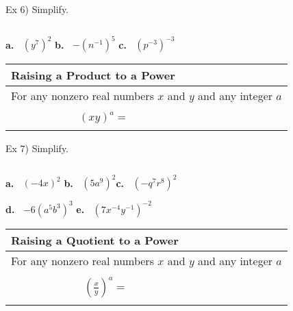\documentclass{ximera}
\begin{document}
\noindent Ex 6) Simplify.

$~$

\textbf{a.}$~~~~$$\displaystyle (y^7)^2$\hspace{1.3in} \textbf{b.}$~~~~$$\displaystyle -(n^{-1})^5$\hspace{1.3in}
\textbf{c.}$~~~~$$\displaystyle (p^{-3})^{-3} $ 

\pagebreak

\begin{center} \begin{tabular}{|l|}
\hline 
Raising a Product to a Power\\
\hline
For any nonzero real numbers $x$ and $y$ and any integer $a$\\
$~$\\
$~~~~~~~~~~~~~~~~~~~~~~~~~~~~${\Large$\displaystyle \left(xy\right)^a=~~~~$}\\
$~$\\
\hline
\end{tabular} \end{center}

\noindent Ex 7) Simplify.

$~$

\textbf{a.}$~~~~$$\displaystyle (-4x)^2$\hspace{1.75in} \textbf{b.}$~~~~$$\displaystyle (5a^9)^2$\hspace{1.75in}\textbf{c.}$~~~~$$\displaystyle (-q^7r^8)^2  $

\vspace{.75in}

\hspace{1in}\textbf{d.}$~~~~$$\displaystyle -6(a^5b^3)^3  $\hspace{2in} \textbf{e.}$~~~~$$\displaystyle (7x^{-4}y^{-1})^{-2}$

\vspace{.5in}

\begin{center} \begin{tabular}{|l|}
\hline 
Raising a Quotient to a Power\\
\hline
For any nonzero real numbers $x$ and $y$ and any integer $a$\\
$~$\\
$~~~~~~~~~~~~~~~~~~~~~~~~~~~~~~${\Large$\displaystyle \left(\frac{x}{y}\right)^a=~~~~$}\\
$~$\\
\hline
\end{tabular} \end{center}
\end{document}
